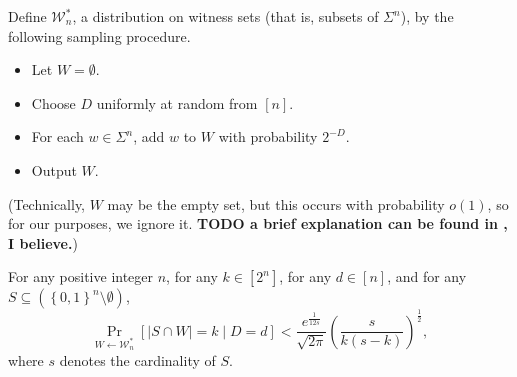 \documentclass{article}
\newcommand{\todo}[1]{\textbf{TODO #1}}
\newcommand{\mc}{\mathcal}
\begin{document}
Define $\mc{W}_n^*$, a distribution on witness sets (that is, subsets of $\Sigma^n$), by the following sampling procedure.
\begin{itemize}
\item Let $W = \emptyset$.
\item Choose $D$ uniformly at random from $[n]$.
\item For each $w \in \Sigma^n$, add $w$ to $W$ with probability $2^{-D}$.
\item Output $W$.
\end{itemize}
(Technically, $W$ may be the empty set, but this occurs with probability $o(1)$, so for our purposes, we ignore it.
\todo{a brief explanation can be found in \autocite{krw14}, I believe.})

\begin{lemma}\label{lem:prob}
  For any positive integer $n$, for any $k \in [2^n]$, for any $d \in [n]$, and for any $S \subseteq \left(\left\{0, 1\right\}^n \setminus \emptyset\right)$,
  \begin{equation*}
    \Pr_{W \gets \mc{W}_n^*}\left[ |S \cap W| = k \middle| D = d\right] < \frac{e^{\frac{1}{12s}}}{\sqrt{2 \pi}} \left(\frac{s}{k (s - k)}\right)^{\frac{1}{2}},
  \end{equation*}
  where $s$ denotes the cardinality of $S$.
\end{lemma}
\end{document}
